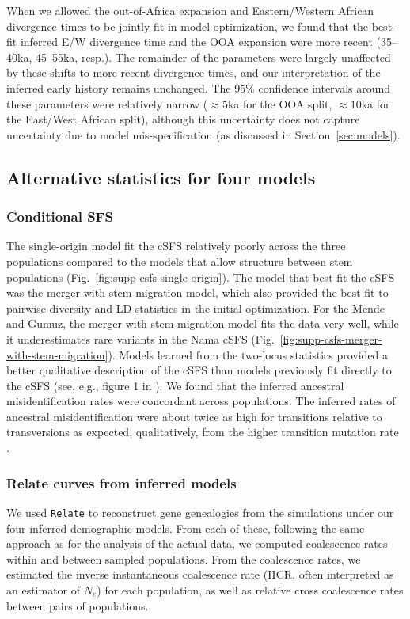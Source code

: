 \documentclass[]{article}
\newcommand{\Relate}{\texttt{Relate}\xspace}
\begin{document}
When we allowed the out-of-Africa expansion and Eastern/Western African
divergence times to be jointly fit in model optimization, we found that the
best-fit inferred E/W divergence time and the OOA expansion were more recent
(35--40ka, 45--55ka, resp.). The remainder of the parameters were largely
unaffected by these shifts to more recent divergence times, and our
interpretation of the inferred early history remains unchanged. The $95\%$
confidence intervals around these parameters were relatively narrow ($\approx
5$ka for the OOA split, $\approx 10$ka for the East/West African split),
although this uncertainty does not capture uncertainty due to model
mis-specification (as discussed in Section~\ref{sec:models}).

\subsection{Alternative statistics for four models}

\subsubsection{Conditional SFS}
\label{sec:cSFS}
The single-origin model fit the cSFS relatively poorly across the three
populations compared to the models that allow structure between stem
populations (Fig.~\ref{fig:supp-csfs-single-origin}). The model that best fit
the cSFS was the merger-with-stem-migration model, which also provided the best
fit to pairwise diversity and LD statistics in the initial optimization. For
the Mende and Gumuz, the merger-with-stem-migration model fits the data very
well, while it underestimates rare variants in the Nama cSFS
(Fig.~\ref{fig:supp-csfs-merger-with-stem-migration}). Models learned from the
two-locus statistics provided a better qualitative description of the cSFS than
models previously fit directly to the cSFS  (see, e.g., figure 1 in
\citet{Durvasula2020-td}). We found that the inferred ancestral
misidentification rates were concordant across populations. The inferred rates
of ancestral misidentification were about twice as high for transitions
relative to transversions as expected, qualitatively, from the higher
transition mutation rate \citep{Hernandez2007-mf}.

\subsubsection{Relate curves from inferred models}
\label{inferred_relate}
We used \Relate \citep{Speidel2019-nj} to reconstruct gene genealogies from the
simulations under our four inferred demographic models. From each of these,
following the same approach as for the analysis of the actual data, we computed
coalescence rates within and between sampled populations. From the coalescence
rates, we estimated the inverse instantaneous coalescence rate (IICR, often
interpreted as an estimator of $N_e$) for each population, as well as relative
cross coalescence rates between pairs of populations.
\end{document}
